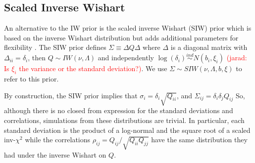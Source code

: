 \documentclass[a4paper]{article}
\newcommand{\jarad}[1]{\textcolor{red}{(jarad: #1)}}
\begin{document}


\subsection{Scaled Inverse Wishart \label{sec:siw}}

An alternative to the IW prior is the scaled inverse Wishart (SIW) prior which is based on the inverse Wishart distribution but adds additional parameters for flexibility \citep{odomain}. The SIW prior defines $\Sigma \equiv \Delta Q \Delta $ where $\Delta$ is a diagonal matrix with $\Delta_{ii}=\delta_i$, then $Q \sim  IW(\nu, \Lambda)$ and independently $\log(\delta_i) \stackrel{ind} \sim N(b_i, \xi_i)$ \jarad{Is $\xi_i$ the variance or the standard deviation?}.  We use $\Sigma \sim SIW(\nu, \Lambda, b, \xi)$ to refer to this prior. 

By construction, the SIW prior implies that $\sigma_i = \delta_i \sqrt{Q_{ii}}$, and $\Sigma_{ij}=\delta_i\delta_jQ_{ij}$ So, although there is no closed from expression for the standard deviations and correlations, simulations from these distributions are trivial. In particular, each standard deviation is the product of a log-normal and the square root of a scaled inv-$\chi^2$ while the correlations $\rho_{ij} = Q_{ij}/\sqrt{Q_{ii}Q_{jj}}$ have the same distribution they had under the inverse Wishart on $Q$.  
\end{document}
